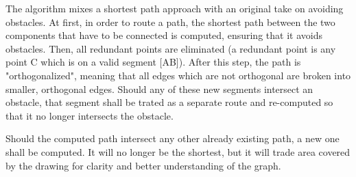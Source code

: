 The algorithm mixes a shortest path approach with an original take on avoiding obstacles.
At first, in order to route a path, the shortest path between the two components that have 
to be connected is computed, ensuring that it avoids obstacles. Then, all redundant points 
are eliminated (a redundant point is any point C which is on a valid segment [AB]). After 
this step, the path is "orthogonalized", meaning that all edges which are not orthogonal are 
broken into smaller, orthogonal edges. Should any of these new segments intersect an obstacle,
that segment shall be trated as a separate route and re-computed so that it no longer 
intersects the obstacle.

Should the computed path intersect any other already existing path, a new one shall be 
computed. It will no longer be the shortest, but it will trade area covered by the drawing 
for clarity and better understanding of the graph.
